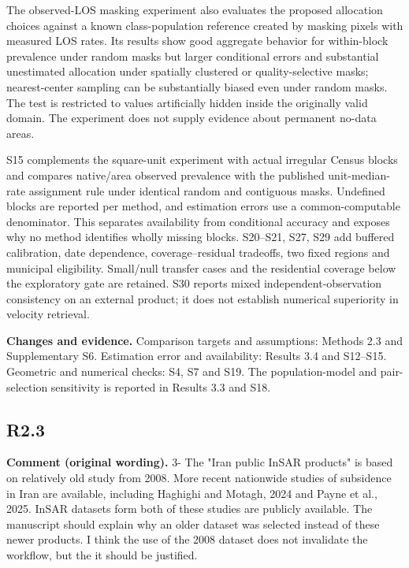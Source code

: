 \documentclass[11pt,a4paper]{article}
\begin{document}
The observed-LOS masking experiment also evaluates the proposed allocation choices against a known class-population reference created by masking pixels with measured LOS rates. Its results show good aggregate behavior for within-block prevalence under random masks but larger conditional errors and substantial unestimated allocation under spatially clustered or quality-selective masks; nearest-center sampling can be substantially biased even under random masks. The test is restricted to values artificially hidden inside the originally valid domain. The experiment does not supply evidence about permanent no-data areas.

S15 complements the square-unit experiment with actual irregular Census blocks and compares native/area observed prevalence with the published unit-median-rate assignment rule under identical random and contiguous masks. Undefined blocks are reported per method, and estimation errors use a common-computable denominator. This separates availability from conditional accuracy and exposes why no method identifies wholly missing blocks. S20--S21, S27, S29 add buffered calibration, date dependence, coverage--residual tradeoffs, two fixed regions and municipal eligibility. Small/null transfer cases and the residential coverage below the exploratory gate are retained. S30 reports mixed independent-observation consistency on an external product; it does not establish numerical superiority in velocity retrieval.

\textbf{Changes and evidence.} Comparison targets and assumptions: Methods 2.3 and Supplementary S6. Estimation error and availability: Results 3.4 and S12--S15. Geometric and numerical checks: S4, S7 and S19. The population-model and pair-selection sensitivity is reported in Results 3.3 and S18.

\subsection*{R2.3}

\textbf{Comment (original wording).} 3- The "Iran public InSAR products" is based on relatively old study from 2008. More recent nationwide studies of subsidence in Iran are available, including Haghighi and Motagh, 2024 and Payne et al., 2025. InSAR datasets form both of these studies are publicly available. The manuscript should explain why an older dataset was selected instead of these newer products. I think the use of the 2008 dataset does not invalidate the workflow, but the it should be justified.
\end{document}
